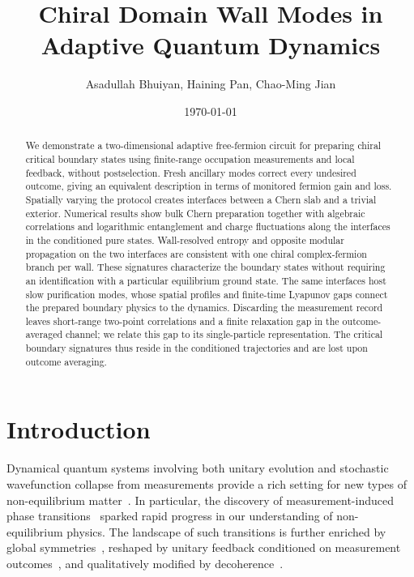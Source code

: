\documentclass[aps,prb,10pt,twocolumn,superscriptaddress,longbibliography,floatfix]{revtex4-2}
\newcommand{\newtext}[1]{{\color{blue}#1}}
\begin{document}
\raggedbottom

\title{Chiral Domain Wall Modes in Adaptive Quantum Dynamics}
\author{Asadullah Bhuiyan, Haining Pan, Chao-Ming Jian}
\noaffiliation
\date{\today}

\begin{abstract}
\newtext{We demonstrate a two-dimensional adaptive free-fermion circuit for preparing chiral critical boundary states using finite-range occupation measurements and local feedback, without postselection. Fresh ancillary modes correct every undesired outcome, giving an equivalent description in terms of monitored fermion gain and loss. Spatially varying the protocol creates interfaces between a Chern slab and a trivial exterior. Numerical results show bulk Chern preparation together with algebraic correlations and logarithmic entanglement and charge fluctuations along the interfaces in the conditioned pure states. Wall-resolved entropy and opposite modular propagation on the two interfaces are consistent with one chiral complex-fermion branch per wall. These signatures characterize the boundary states without requiring an identification with a particular equilibrium ground state. The same interfaces host slow purification modes, whose spatial profiles and finite-time Lyapunov gaps connect the prepared boundary physics to the dynamics. Discarding the measurement record leaves short-range two-point correlations and a finite relaxation gap in the outcome-averaged channel; we relate this gap to its single-particle representation. The critical boundary signatures thus reside in the conditioned trajectories and are lost upon outcome averaging.}
\end{abstract}

\maketitle

\setcounter{tocdepth}{2}
\tableofcontents

\section{Introduction}

Dynamical quantum systems involving both unitary evolution and stochastic wavefunction collapse from measurements provide a rich setting for new types of non-equilibrium matter~\cite{PotterVasseur2022,FisherKhemaniNahumVijay2023}.
In particular, the discovery of measurement-induced phase
transitions~\cite{LiChenFisher2018,SkinnerRuhmanNahum2019,ChanNandkishorePretkoSmith2019,LiChenFisher2019,GullansHuse2020}
sparked rapid progress in our understanding of non-equilibrium physics. The landscape of such transitions is further enriched by global symmetries~\cite{SangHsieh2021,BaoChoiAltman2021,LavasaniAlaviradBarkeshli2021,AgrawalEtAl2022,BarrattEtAl2022,MajidyEtAl2023}, reshaped by unitary feedback conditioned on measurement outcomes~\cite{IadecolaEtAl2023,RavindranathEtAl2023,PiroliEtAl2023,SierantTurkeshi2023,ODeaEtAl2024}, and qualitatively modified by
decoherence~\cite{WeinsteinBaoAltman2022,LiSangHsieh2023,LiuLiZhangJian2024,IvakiOjanenMoghaddam2025}.
\end{document}
